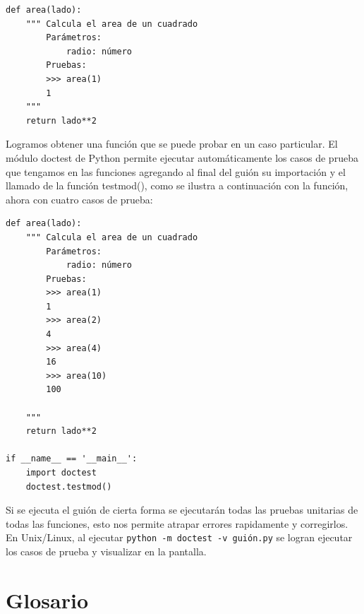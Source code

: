 \beforeverb
\begin{verbatim}
def area(lado):
    """ Calcula el area de un cuadrado
        Parámetros:
            radio: número
        Pruebas:
        >>> area(1)
        1        
    """
    return lado**2
\end{verbatim}
\afterverb

Logramos obtener una función que se puede probar en un caso particular. El 
módulo doctest de Python permite ejecutar automáticamente los casos de 
prueba que tengamos en las funciones agregando al final del guión
su importación y el llamado de la función testmod(), como se ilustra a
continuación con la función, ahora con cuatro casos de prueba:

\beforeverb
\begin{verbatim}
def area(lado):
    """ Calcula el area de un cuadrado
        Parámetros:
            radio: número
        Pruebas:
        >>> area(1)
        1
        >>> area(2)
        4
        >>> area(4)
        16
        >>> area(10)
        100
        
    """
    return lado**2

if __name__ == '__main__':
    import doctest
    doctest.testmod()
\end{verbatim}
\afterverb

Si se ejecuta el guión de cierta forma se ejecutarán todas las pruebas unitarias de todas
las funciones, esto nos permite atrapar errores rapidamente y corregirlos. En Unix/Linux,
al ejecutar \verb+python -m doctest -v guión.py+ se logran ejecutar los casos de prueba y 
visualizar en la pantalla.

\section{Glosario}

